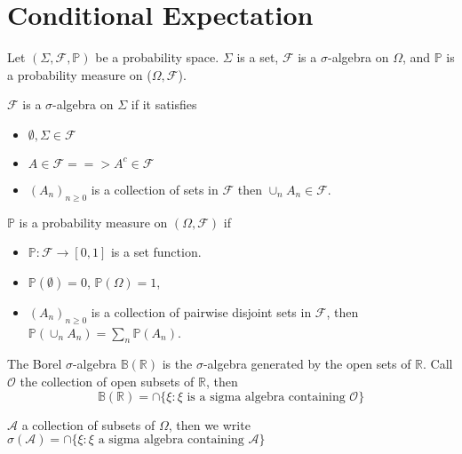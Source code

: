 
\chapter{Conditional Expectation}
\label{cha:cond-expect}

Let $(\Sigma, \mathcal{F}, \mathbb{P})$ be a probability space.
$\Sigma$ is a set, $\mathcal{F}$ is a $\sigma$-algebra on $\Omega$,
and $\mathbb{P}$ is a probability measure on ($\Omega, \mathcal{F}$).

\begin{defn}
  \label{defn:1}
  $\mathcal{F}$ is a $\sigma$-algebra on $\Sigma$ if it satisfies
  \begin{itemize}
  \item $\emptyset, \Sigma \in \mathcal{F}$
  \item $A \in \mathcal{F} ==> A^{c} \in \mathcal{F}$
  \item $(A_n)_{n \geq 0}$ is a collection of sets in $\mathcal{F}$
    then $\cup_{n} A_{n} \in \mathcal{F}$.
  \end{itemize}
\end{defn}

\begin{defn}
  \label{defn:2}
  $\mathbb{P}$ is a probability measure on $(\Omega, \mathcal{F})$ if
  \begin{itemize}
  \item $\mathbb{P}: \mathcal{F} \rightarrow [0, 1]$ is a set function.
  \item $\mathbb{P}(\emptyset) = 0$, $\mathbb{P}(\Omega) = 1$,
  \item $(A_{n})_{n \geq 0}$ is a collection of pairwise disjoint
      sets in $\mathcal{F}$, then $\mathbb{P}(\cup_{n} A_{n}) =
      \sum_{n} \mathbb{P}(A_{n})$.
  \end{itemize}
\end{defn}

\begin{defn}
  \label{defn:3}
  The Borel $\sigma$-algebra $\mathbb{B}(\mathbb{R})$ is the
  $\sigma$-algebra generated by the open sets of $\mathbb{R}$.  Call
  $\mathcal{O}$ the collection of open subsets of $\mathbb{R}$, then
  \begin{equation}
    \label{eq:1}
    \mathbb{B}(\mathbb{R}) = \cap \{ \xi: \xi \text{ is a sigma
      algebra containing $\mathcal{O}$} \}
  \end{equation}
\end{defn}

\begin{defn}
  \label{defn:4}
  $\mathcal{A}$ a collection of subsets of $\Omega$, then we write
  $\sigma(\mathcal{A}) = \cap \{ \xi: \xi \text{ a sigma algebra
    containing $\mathcal{A}$} \}$
\end{defn}

